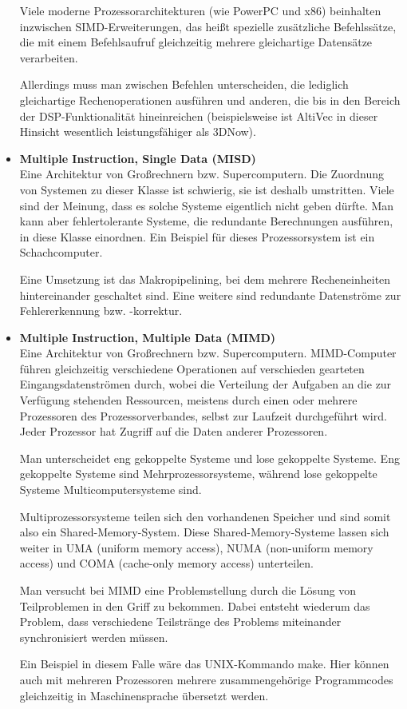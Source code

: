 \begin{itemize}
Viele moderne Prozessorarchitekturen (wie PowerPC und x86) beinhalten inzwischen SIMD-Erweiterungen, das heißt spezielle zusätzliche Befehlssätze, die mit einem Befehlsaufruf gleichzeitig mehrere gleichartige Datensätze verarbeiten.

Allerdings muss man zwischen Befehlen unterscheiden, die lediglich gleichartige Rechenoperationen ausführen und anderen, die bis in den Bereich der DSP-Funktionalität hineinreichen (beispielsweise ist AltiVec in dieser Hinsicht wesentlich leistungsfähiger als 3DNow). 

    \item \textbf{Multiple Instruction, Single Data (MISD)}\\ Eine Architektur von Großrechnern bzw. Supercomputern. Die Zuordnung von Systemen zu dieser Klasse ist schwierig, sie ist deshalb umstritten. Viele sind der Meinung, dass es solche Systeme eigentlich nicht geben dürfte. Man kann aber fehlertolerante Systeme, die redundante Berechnungen ausführen, in diese Klasse einordnen. Ein Beispiel für dieses Prozessorsystem ist ein Schachcomputer.

Eine Umsetzung ist das Makropipelining, bei dem mehrere Recheneinheiten hintereinander geschaltet sind. Eine weitere sind redundante Datenströme zur Fehlererkennung bzw. -korrektur. 

    \item \textbf{Multiple Instruction, Multiple Data (MIMD)}\\ Eine Architektur von Großrechnern bzw. Supercomputern. MIMD-Computer führen gleichzeitig verschiedene Operationen auf verschieden gearteten Eingangsdatenströmen durch, wobei die Verteilung der Aufgaben an die zur Verfügung stehenden Ressourcen, meistens durch einen oder mehrere Prozessoren des Prozessorverbandes, selbst zur Laufzeit durchgeführt wird. Jeder Prozessor hat Zugriff auf die Daten anderer Prozessoren.

Man unterscheidet eng gekoppelte Systeme und lose gekoppelte Systeme. Eng gekoppelte Systeme sind Mehrprozessorsysteme, während lose gekoppelte Systeme Multicomputersysteme sind.

Multiprozessorsysteme teilen sich den vorhandenen Speicher und sind somit also ein Shared-Memory-System. Diese Shared-Memory-Systeme lassen sich weiter in UMA (uniform memory access), NUMA (non-uniform memory access) und COMA (cache-only memory access) unterteilen.

Man versucht bei MIMD eine Problemstellung durch die Lösung von Teilproblemen in den Griff zu bekommen. Dabei entsteht wiederum das Problem, dass verschiedene Teilstränge des Problems miteinander synchronisiert werden müssen.

Ein Beispiel in diesem Falle wäre das UNIX-Kommando make. Hier können auch mit mehreren Prozessoren mehrere zusammengehörige Programmcodes gleichzeitig in Maschinensprache übersetzt werden. 
        \end{itemize}
        
